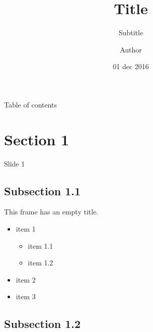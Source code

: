 \documentclass{beamer}
\title{Title}
\subtitle{Subtitle}
\author{Author}
\date{01 dec 2016}
\begin{document}
    \begin{frame}
        \maketitle
    \end{frame}
    
    \begin{frame}{Table of contents}
      \tableofcontents
    \end{frame}
    
    \section{Section 1}
    \begin{frame}{Slide 1}
        \lipsum[1]
    \end{frame}
    
    \subsection{Subsection 1.1}
    \begin{frame}
        This frame has an empty title.
        \vfill
        \begin{itemize}
            \item item 1
            \begin{itemize}
                \item item 1.1
                \item item 1.2
            \end{itemize}
            \item item 2
            \item item 3
        \end{itemize}
    \end{frame}
    
    \subsection{Subsection 1.2}
    
\end{document}
